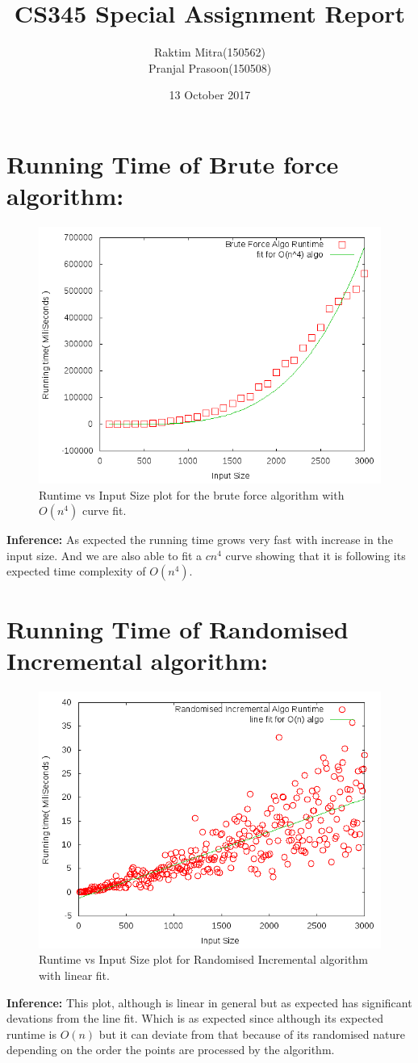 \documentclass{article}
\title{CS345 Special Assignment Report}
\author{Raktim Mitra(150562) \\
    Pranjal Prasoon(150508)}
\date{13 October 2017}
\begin{document}
\maketitle
\newpage
\section*{Running Time of Brute force algorithm:}
\begin{figure}[th]%
\centering

\includegraphics[width=0.5\columnwidth]{brute1.png}%
\caption{Runtime vs Input Size plot for the brute force algorithm with $O(n^{4})$ curve fit. }
\label{fig:proto}%
\end{figure}

\textbf{Inference:} As expected the running time grows very fast with increase in the input size. And we are also able to fit a $cn^4$ curve showing that it is following its expected time complexity of $O(n^4)$.
\section*{Running Time of Randomised Incremental algorithm:}
\begin{figure}[th]%
\centering

\includegraphics[width=0.5\columnwidth]{incr_loop1.png}%
\caption{Runtime vs Input Size plot for Randomised Incremental algorithm with linear fit. }
\label{fig:proto}%
\end{figure}
\textbf{Inference:} This plot, although is linear in general but as expected has significant devations from the line fit. Which is as expected since although its expected runtime is $O(n)$ but it can deviate from that because of its randomised nature depending on the order the points are processed by the algorithm. 
\newpage
\end{document}
